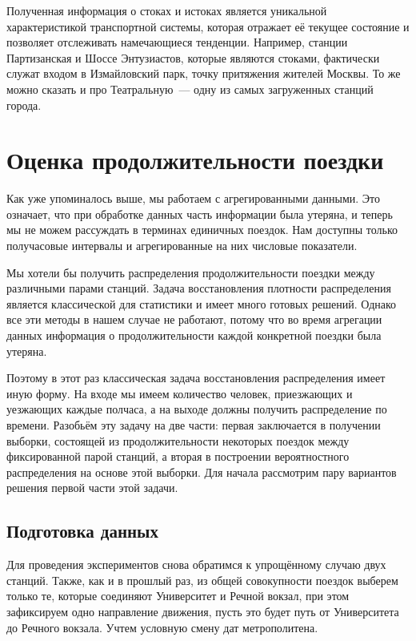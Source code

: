 \documentclass[12pt, fleqn, titlepage]{article}
\begin{document}
    Полученная информация о стоках и истоках является уникальной характеристикой транспортной системы, которая 
    отражает её текущее состояние и позволяет отслеживать намечающиеся тенденции. Например, станции Партизанская 
    и Шоссе Энтузиастов, которые являются стоками, фактически служат входом в Измайловский парк, точку притяжения 
    жителей Москвы. То же можно сказать и про Театральную~--- одну из самых загруженных станций города.

    \section{Оценка продолжительности поездки}

    Как уже упоминалось выше, мы работаем с агрегированными данными. 
    Это означает, что при обработке данных часть информации была утеряна, и теперь мы не 
    можем рассуждать в терминах единичных поездок. Нам доступны только получасовые интервалы 
    и агрегированные на них числовые показатели.

    Мы хотели бы получить распределения продолжительности поездки между различными парами станций. Задача восстановления плотности 
    распределения является классической для статистики и имеет много готовых решений. Однако все эти методы в нашем случае не работают, 
    потому что во время агрегации данных информация о продолжительности каждой конкретной поездки была утеряна. 

    Поэтому в этот раз классическая задача восстановления распределения имеет иную форму. На входе мы имеем количество человек, приезжающих 
    и уезжающих каждые полчаса, а на выходе должны получить распределение по времени. 
    Разобьём эту задачу на две части: первая заключается в получении выборки, состоящей из продолжительности некоторых поездок между 
    фиксированной парой станций, а вторая в построении вероятностного распределения на основе этой выборки. Для начала рассмотрим 
    пару вариантов решения первой части этой задачи.

    \subsection{Подготовка данных}

    Для проведения экспериментов снова обратимся к упрощённому случаю двух станций.
    Также, как и в прошлый раз, из общей совокупности поездок выберем только те, которые соединяют Университет и 
    Речной вокзал, при этом зафиксируем одно направление движения, пусть это будет путь от Университета до 
    Речного вокзала. Учтем условную смену дат метрополитена. 
\end{document}
